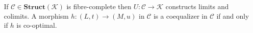 If $\mathcal{C} \in \mathbf{Struct}(\mathcal{K})$ is fibre-complete then $U: \mathcal{C} \longrightarrow \mathcal{K}$ constructs limits and colimits. A morphism $h: (L, t) \longrightarrow (M, u)$ in $\mathcal{C}$ is a coequalizer in $\mathcal{C}$ if and only if $h$ is co-optimal.
